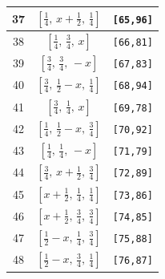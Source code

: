 \documentclass[fleqn,8pt]{jsarticle}
\begin{document}
\begin{longtable}{ccc}
37 & $\left[ \frac{1}{4},\, x + \frac{1}{2},\, \frac{1}{4} \right]$ & {\tt [65,96]} \\ \hline
38 & $\left[ \frac{1}{4},\, \frac{3}{4},\, x \right]$ & {\tt [66,81]} \\ \hline
39 & $\left[ \frac{3}{4},\, \frac{3}{4},\, - x \right]$ & {\tt [67,83]} \\ \hline
40 & $\left[ \frac{3}{4},\, \frac{1}{2} - x,\, \frac{1}{4} \right]$ & {\tt [68,94]} \\ \hline
41 & $\left[ \frac{3}{4},\, \frac{1}{4},\, x \right]$ & {\tt [69,78]} \\ \hline
42 & $\left[ \frac{1}{4},\, \frac{1}{2} - x,\, \frac{3}{4} \right]$ & {\tt [70,92]} \\ \hline
43 & $\left[ \frac{1}{4},\, \frac{1}{4},\, - x \right]$ & {\tt [71,79]} \\ \hline
44 & $\left[ \frac{3}{4},\, x + \frac{1}{2},\, \frac{3}{4} \right]$ & {\tt [72,89]} \\ \hline
45 & $\left[ x + \frac{1}{2},\, \frac{1}{4},\, \frac{1}{4} \right]$ & {\tt [73,86]} \\ \hline
46 & $\left[ x + \frac{1}{2},\, \frac{3}{4},\, \frac{3}{4} \right]$ & {\tt [74,85]} \\ \hline
47 & $\left[ \frac{1}{2} - x,\, \frac{1}{4},\, \frac{3}{4} \right]$ & {\tt [75,88]} \\ \hline
48 & $\left[ \frac{1}{2} - x,\, \frac{3}{4},\, \frac{1}{4} \right]$ & {\tt [76,87]} \\
\end{longtable}
\renewcommand{\arraystretch}{1.2}
\end{document}
